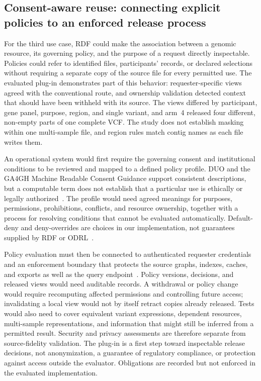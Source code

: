 \documentclass[pdflatex,sn-mathphys-num]{sn-jnl}
\begin{document}
\subsection{Consent-aware reuse: connecting explicit policies to an enforced release process}\label{subsec:disc-consent}
For the third use case, RDF could make the association between a genomic resource, its governing policy, and the purpose of a request directly inspectable.
Policies could refer to identified files, participants' records, or declared selections without requiring a separate copy of the source file for every permitted use.
The evaluated plug-in demonstrates part of this behavior: requester-specific views agreed with the conventional route, and ownership validation detected context that should have been withheld with its source.
The views differed by participant, gene panel, purpose, region, and single variant, and arm~4 released four different, non-empty parts of one complete VCF.
The study does not establish masking within one multi-sample file, and region rules match contig names as each file writes them.

An operational system would first require the governing consent and institutional conditions to be reviewed and mapped to a defined policy profile.
DUO and the GA4GH Machine Readable Consent Guidance support consistent descriptions, but a computable term does not establish that a particular use is ethically or legally authorized~\cite{lawson2021duo,ga4gh_mrcg,rehm2021ga4gh}.
The profile would need agreed meanings for purposes, permissions, prohibitions, conflicts, and resource ownership, together with a process for resolving conditions that cannot be evaluated automatically.
Default-deny and deny-overrides are choices in our implementation, not guarantees supplied by RDF or ODRL~\cite{odrl_2018}.

Policy evaluation must then be connected to authenticated requester credentials and an enforcement boundary that protects the source graphs, indexes, caches, and exports as well as the query endpoint~\cite{xacml3_2013,rehm2021ga4gh}.
Policy versions, decisions, and released views would need auditable records.
A withdrawal or policy change would require recomputing affected permissions and controlling future access; invalidating a local view would not by itself retract copies already released.
Tests would also need to cover equivalent variant expressions, dependent resources, multi-sample representations, and information that might still be inferred from a permitted result.
Security and privacy assessments are therefore separate from source-fidelity validation.
The plug-in is a first step toward inspectable release decisions, not anonymization, a guarantee of regulatory compliance, or protection against access outside the evaluator.
Obligations are recorded but not enforced in the evaluated implementation.
\end{document}
